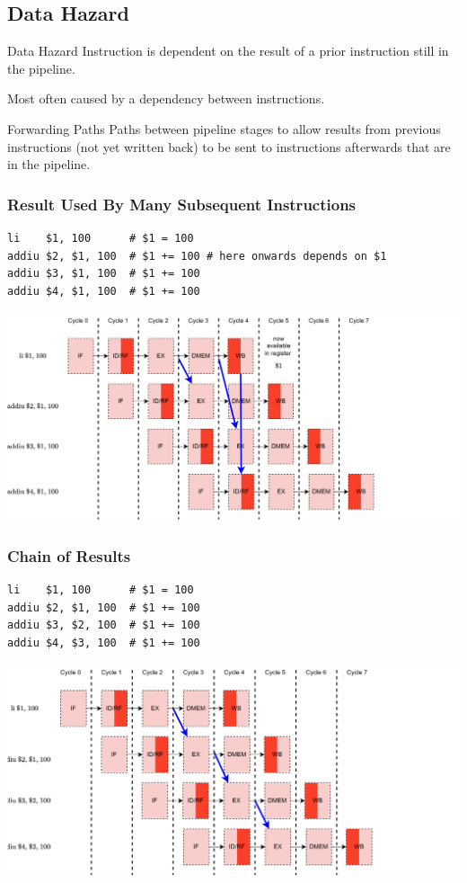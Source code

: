 \subsection{Data Hazard}
\begin{definitionbox}{Data Hazard}
	Instruction is dependent on the result of a prior instruction still in the pipeline.
\end{definitionbox}
Most often caused by a dependency between instructions.
\begin{definitionbox}{Forwarding Paths}
	Paths between pipeline stages to allow results from previous instructions (not yet written back) to be sent to instructions afterwards that are in the pipeline.
\end{definitionbox}
\subsubsection{Result Used By Many Subsequent Instructions}
\begin{verbatim}
li    $1, 100      # $1 = 100
addiu $2, $1, 100  # $1 += 100 # here onwards depends on $1
addiu $3, $1, 100  # $1 += 100
addiu $4, $1, 100  # $1 += 100
\end{verbatim}
\begin{center}
	\includegraphics[width=.9\textwidth]{pipelining/images/pipeline_operand_forward_1.drawio.png}
\end{center}

\subsubsection{Chain of Results}
\begin{verbatim}
li    $1, 100      # $1 = 100
addiu $2, $1, 100  # $1 += 100
addiu $3, $2, 100  # $1 += 100
addiu $4, $3, 100  # $1 += 100
\end{verbatim}
\begin{center}
	\includegraphics[width=.9\textwidth]{pipelining/images/pipeline_operand_forward_2.drawio.png}
\end{center}
